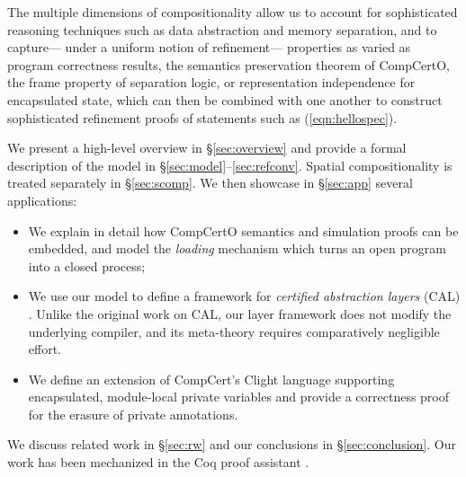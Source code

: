 \documentclass[acmsmall,nonacm]{acmart}
\begin{document}
The multiple dimensions of compositionality
allow us to account for sophisticated reasoning techniques
such as data abstraction and memory separation,
and to capture---%
under a uniform notion of refinement---%
properties as varied as
    program correctness results,
    the semantics preservation theorem of CompCertO,
    the frame property of separation logic, or
    representation independence for encapsulated state,
which can then be combined with one another
to construct sophisticated refinement proofs
of statements such as (\ref{eqn:hellospec}).

We present a high-level overview in \S\ref{sec:overview}
and provide a formal description of the model in \S\ref{sec:model}--\ref{sec:refconv}.
Spatial compositionality is treated separately in \S\ref{sec:scomp}.
We then showcase in \S\ref{sec:app} several applications:
\begin{itemize}
  \item We explain in detail how
    CompCertO semantics and simulation proofs can be embedded,
    and model the \emph{loading} mechanism
    which turns an open program into a closed process;
  \item We use our model to define a framework for
    \emph{certified abstraction layers} (CAL) \cite{popl15}.
    Unlike the original work on CAL,
    our layer framework does not modify the underlying compiler,
    and its meta-theory requires comparatively negligible effort.
  \item We define an extension of CompCert's Clight language
    supporting encapsulated, module-local private variables
    and provide a correctness proof for the erasure of private annotations.
\end{itemize}
We discuss related work in \S\ref{sec:rw}
and our conclusions in \S\ref{sec:conclusion}.
Our work has been mechanized in the Coq proof assistant \cite{compcertoe-artifact}.
\end{document}
